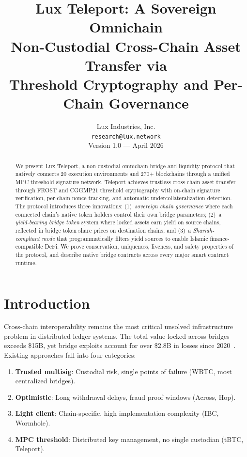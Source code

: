 \documentclass[11pt,twocolumn]{article}
\title{
  \textbf{Lux Teleport: A Sovereign Omnichain } \\[6pt]
  \large Non-Custodial Cross-Chain Asset Transfer via \\
  Threshold Cryptography and Per-Chain Governance
}
\author{
  Lux Industries, Inc. \\
  \texttt{research@lux.network} \\[4pt]
  \small Version 1.0 --- April 2026
}
\date{}
\begin{document}
\maketitle

\begin{abstract}
We present Lux Teleport, a non-custodial omnichain bridge and liquidity protocol that natively connects 20 execution environments and 270+ blockchains through a unified MPC threshold signature network.
Teleport achieves trustless cross-chain asset transfer through FROST and CGGMP21 threshold cryptography with on-chain signature verification, per-chain nonce tracking, and automatic undercollateralization detection.
The protocol introduces three innovations:
(1)~\emph{sovereign chain governance} where each connected chain's native token holders control their own bridge parameters;
(2)~a \emph{yield-bearing bridge token} system where locked assets earn yield on source chains, reflected in bridge token share prices on destination chains; and
(3)~a \emph{Shariah-compliant mode} that programmatically filters yield sources to enable Islamic finance-compatible DeFi.
We prove conservation, uniqueness, liveness, and safety properties of the protocol, and describe native bridge contracts across every major smart contract runtime.
\end{abstract}

\section{Introduction}

Cross-chain interoperability remains the most critical unsolved infrastructure problem in distributed ledger systems. The total value locked across bridges exceeds \$15B, yet bridge exploits account for over \$2.8B in losses since 2020~\cite{rekt}. Existing approaches fall into four categories:

\begin{enumerate}[nosep]
  \item \textbf{Trusted multisig}: Custodial risk, single points of failure (WBTC, most centralized bridges).
  \item \textbf{Optimistic}: Long withdrawal delays, fraud proof windows (Across, Hop).
  \item \textbf{Light client}: Chain-specific, high implementation complexity (IBC, Wormhole).
  \item \textbf{MPC threshold}: Distributed key management, no single custodian (tBTC, Teleport).
\end{enumerate}
\end{document}
